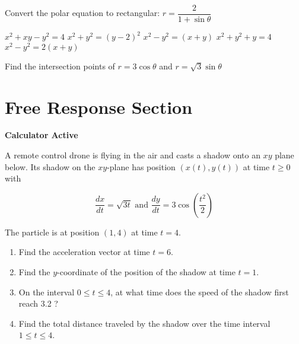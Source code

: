 \documentclass[11pt]{exam}
\begin{document}
\begin{questions}
\begin{minipage}{\linewidth}
\question Convert the polar equation to rectangular: $r = \dfrac{2}{1 + \sin \theta}$

\begin{choices}
	\choice $x^2 + xy - y^2 = 4$
	\correctchoice $x^2 + y^2 = (y-2)^2$
	\choice $x^2 - y^2 = (x+y)$
	\choice $x^2+y^2 + y = 4$
	\choice $x^2 - y^2 = 2(x+y)$
\end{choices} \answerline
\end{minipage}

\begin{minipage}{\linewidth}


\question Find the intersection points of $r = 3 \cos \theta$ and $r = \sqrt3 \sin \theta$

\begin{choices}

\end{choices} \answerline
\end{minipage}

\end{questions}

\clearpage
\section*{Free Response Section}
\noindent
\textbf{Calculator Active}
\vspace{2ex}

A remote control drone is flying in the air and casts a shadow onto
an $xy$ plane below. Its shadow on the $x y$-plane has position $(x(t), y(t))$ at time $t \geq 0$ with

$$
\frac{d x}{d t}=\sqrt{3 t} \text { and } \frac{d y}{d t}=3 \cos \left(\frac{t^{2}}{2}\right)
$$

The particle is at position $(1,4)$ at time $t=4$.
\begin{enumerate}
\item Find the acceleration vector at time $t=6$.
\vspace{1in}
\item Find the $y$-coordinate of the position of the shadow at time $t=1$.
\vspace{1in}
\item On the interval $0 \leq t \leq 4$, at what time does the speed of the shadow first reach 3.2 ?
\vspace{2in}
\item Find the total distance traveled by the shadow over the time interval $1 \leq t \leq 4$.
\end{enumerate}
\end{document}
